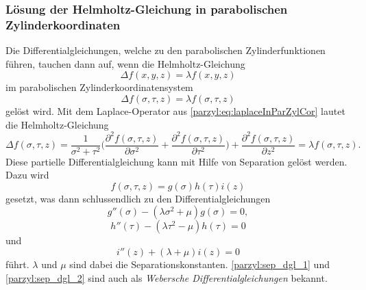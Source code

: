 \subsubsection{Lösung der Helmholtz-Gleichung in parabolischen Zylinderkoordinaten}
Die Differentialgleichungen, welche zu den parabolischen Zylinderfunktionen führen, tauchen
dann auf, wenn die Helmholtz-Gleichung
\begin{equation}
	\Delta f(x,y,z) = \lambda f(x,y,z) 
\end{equation}
im parabolischen Zylinderkoordinatensystem
\begin{equation}
	\Delta f(\sigma,\tau,z) = \lambda f(\sigma,\tau,z) 
\end{equation}
gelöst wird.
Mit dem Laplace-Operator aus \eqref{parzyl:eq:laplaceInParZylCor}
lautet die Helmholtz-Gleichung
\begin{equation}
	\Delta f(\sigma, \tau, z)
	=
	\frac{1}{\sigma^2 + \tau^2}
	\biggl( 
	\frac{\partial^2 f(\sigma,\tau,z)}{\partial \sigma^2} 
	+ 
	\frac{\partial^2 f(\sigma,\tau,z)}{\partial \tau^2}
	\biggr)
	+ 
	\frac{\partial^2 f(\sigma,\tau,z)}{\partial z^2}
	= 
	\lambda f(\sigma,\tau,z).
\end{equation}
Diese partielle Differentialgleichung kann mit Hilfe von Separation
gelöst werden.
Dazu wird 
\begin{equation}
	f(\sigma,\tau,z) = g(\sigma)h(\tau)i(z)
\end{equation}
gesetzt, was dann schlussendlich zu den Differentialgleichungen 
\begin{equation}\label{parzyl:sep_dgl_1}
	g''(\sigma) 
	- 
	(
	\lambda\sigma^2
	+
	\mu 
	)
	g(\sigma)
	=
	0,
\end{equation}
\begin{equation}\label{parzyl:sep_dgl_2}
	h''(\tau) 
	- 
	(
	\lambda\tau^2
	-
	\mu 
	)
	h(\tau)
	=
	0
\end{equation}
und
\begin{equation}\label{parzyl:sep_dgl_3}
	i''(z) 
	+
	(
	\lambda
	+
	\mu 
	)
	i(z)
	=
	0
\end{equation}
führt. $\lambda$ und $\mu$ sind dabei die Separationskonstanten. 
%
\eqref{parzyl:sep_dgl_1} und \eqref{parzyl:sep_dgl_2} sind auch 
als {\em Webersche Differentialgleichungen} bekannt.
%


